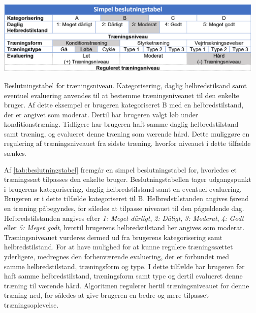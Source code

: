 \begin{table}[H]
\centering
\includegraphics[width=1\textwidth]{figures/aktivitetsdiagram/beslutningstabel}
\caption{Beslutningstabel for træningsniveau. Kategorisering, daglig helbredstilsand samt eventuel evaluering anvendes til at bestemme træningsniveauet til den enkelte bruger. Af dette eksempel er brugeren kategoriseret B med en helbredstilstand, der er angivet som moderat. Dertil har brugeren valgt løb under konditionstræning. Tidligere har brugeren haft samme daglig helbredstilstand samt træning, og evalueret denne træning som værende hård. Dette muliggøre en regulering af træningsniveauet fra sidste træning, hvorfor niveauet i dette tilfælde sænkes.}
\label{tab:beslutningstabel}
\end{table} 

\noindent
Af \autoref{tab:beslutningstabel} fremgår en simpel beslutningstabel for, hvorledes et træningssæt tilpasses den enkelte bruger. Beslutningstabellen tager udgangspunkt i brugerens kategorisering, daglig helbredstilstand samt en eventuel evaluering. Brugeren er i dette tilfælde kategoriseret til B. Helbredstilstanden angives førend en træning påbegyndes, for således at tilpasse niveauet til den pågældende dag. Helbredstilstanden angives efter \textit{1: Meget dårligt}, \textit{2: Dåligt}, \textit{3: Moderat}, \textit{4: Godt} eller \textit{5: Meget godt}, hvortil brugerens helbredstilstand her angives som moderat.
Træningsniveauet vurderes dermed ud fra brugerens kategorisering samt helbredstilstand. 
For at have mulighed for at kunne regulere træningssættet yderligere, medregnes den forhenværende evaluering, der er forbundet med samme helbredstilstand, træningsform og type. I dette tilfælde har brugeren før haft samme helbredstilstand, træningsform samt type og dertil evalueret denne træning til værende hård. Algoritmen regulerer hertil træningsniveauet for denne træning ned, for således at give brugeren en bedre og mere tilpasset træningsoplevelse. 
